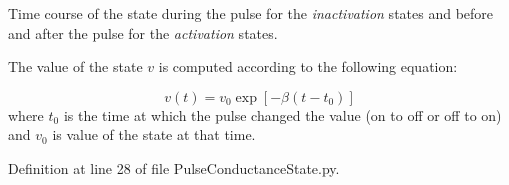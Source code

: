 Time course of the state during the pulse for the {\itshape inactivation} states and before and after the pulse for the {\itshape activation} states. 

The value of the state $v$ is computed according to the following equation\+:

\begin{equation} v(t) = v_0\exp[-\beta(t-t_0)] \end{equation} where $t_0$ is the time at which the pulse changed the value (on to off or off to on) and $v_0$ is value of the state at that time. 

Definition at line 28 of file Pulse\+Conductance\+State.\+py.

